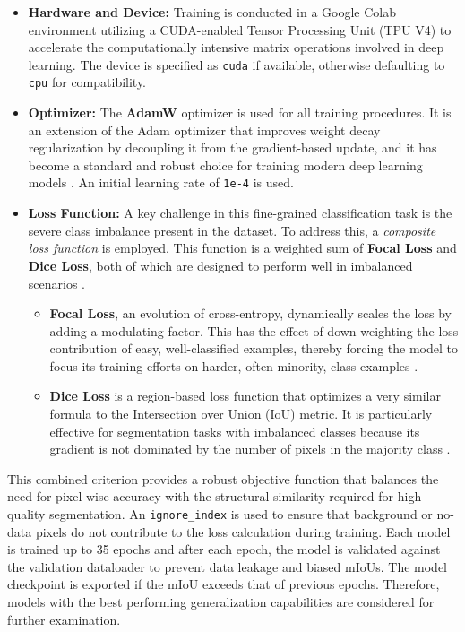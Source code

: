 \documentclass{report}
\begin{document}
\begin{itemize}
    \item \textbf{Hardware and Device:} Training is conducted in a Google Colab environment utilizing a CUDA-enabled Tensor Processing Unit (TPU V4) to accelerate the computationally intensive matrix operations involved in deep learning. The device is specified as \texttt{cuda} if available, otherwise defaulting to \texttt{cpu} for compatibility.
    \item \textbf{Optimizer:} The \textbf{AdamW} optimizer is used for all training procedures. It is an extension of the Adam optimizer that improves weight decay regularization by decoupling it from the gradient-based update, and it has become a standard and robust choice for training modern deep learning models \parencite[p.~7]{LoshchilovHutterDecoupledWeightDecayRegularization2017}. An initial learning rate of \texttt{1e-4} is used.
    \item \textbf{Loss Function:} A key challenge in this fine-grained classification task is the severe class imbalance present in the dataset. To address this, a \textit{composite loss function} is employed. This function is a weighted sum of \textbf{Focal Loss} and \textbf{Dice Loss}, both of which are designed to perform well in imbalanced scenarios \parencite[p.~8.]{SertelEtAlLandUseLandCoverMappingUsingDeepLearningBasedSegmentationApproachesVHRWorldview3Images2022}.
        \begin{itemize}
            \item \textbf{Focal Loss}, an evolution of cross-entropy, dynamically scales the loss by adding a modulating factor. This has the effect of down-weighting the loss contribution of easy, well-classified examples, thereby forcing the model to focus its training efforts on harder, often minority, class examples \parencite[chapter ~4.1.]{WangEtAlComprehensiveSurveyLossFunctionsMachineLearning2022}.
            \item \textbf{Dice Loss} is a region-based loss function that optimizes a very similar formula to the Intersection over Union (IoU) metric. It is particularly effective for segmentation tasks with imbalanced classes because its gradient is not dominated by the number of pixels in the majority class \parencite[Table 1, Formula 8]{Jadonsurveylossfunctionssemanticsegmentation2020}.
        \end{itemize}
    \end{itemize}

    This combined criterion provides a robust objective function that balances the need for pixel-wise accuracy with the structural similarity required for high-quality segmentation. An \texttt{ignore\_index} is used to ensure that background or no-data pixels do not contribute to the loss calculation during training. Each model is trained up to 35 epochs and after each epoch, the model is validated against the validation dataloader to prevent data leakage and biased mIoUs. The model checkpoint is exported if the mIoU exceeds that of previous epochs. Therefore, models with the best performing generalization capabilities are considered for further examination. 
\end{document}
